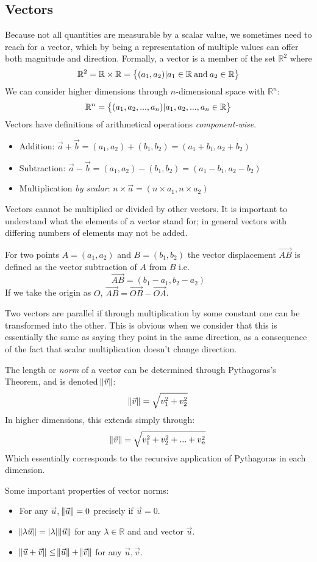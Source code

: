 \documentclass[12pt]{report}
\newcommand{\R}{\mathbb{R}}
\begin{document}
\begin{flushleft}
\section*{Vectors}
Because not all quantities are measurable by a scalar value, we sometimes need to reach
for a vector, which by being a representation of multiple values can offer both magnitude
and direction. Formally, a vector is a member of the set \(\R^2\) where
\[\R^2 = \R \times \R = \set{(a_1, a_2) | a_1 \in \R \:\mathrm{and}\: a_2 \in \R}\]
We can consider higher dimensions through \(n\)-dimensional space with \(\R^n\):
\[\R^n = \set{(a_1, a_2, ..., a_n) | a_1, a_2, ..., a_n \in \R}\]
Vectors have definitions of arithmetical operations \textit{component-wise}.
\begin{itemize}
    \item Addition: \(\vec{a} + \vec{b} = (a_1, a_2) + (b_1, b_2) = (a_1 + b_1, a_2 + b_2)\)
    \item Subtraction: \(\vec{a} - \vec{b} = (a_1, a_2) - (b_1, b_2) = (a_1 - b_1, a_2 - b_2)\)
    \item Multiplication \textit{by scalar}: \(n \times \vec{a} = (n \times a_1, n \times a_2)\)
\end{itemize}
Vectors cannot be multiplied or divided by other vectors. It is important to understand
what the elements of a vector stand for; in general vectors with differing numbers of
elements may not be added.

\bigskip
For two points \(A = (a_1, a_2)\) and \(B = (b_1, b_2)\) the vector displacement \(\vec{AB}\) is
defined as the vector subtraction of \(A\) from \(B\) i.e.
\[\vec{AB} = (b_1 - a_1, b_2 - a_2)\]
If we take the origin as \(O\), \(\vec{AB} = \vec{OB} - \vec{OA}\).

\bigskip
Two vectors are parallel if through multiplication by some constant one can
be transformed into the other. This is obvious when we consider that this is essentially
the same as saying they point in the same direction, as a consequence of the
fact that scalar multiplication doesn't change direction.

\bigskip
The length or \textit{norm} of a vector can be determined through Pythagoras's Theorem, and is
denoted \(\norm{\vec{v}}\):
\[\norm{\vec{v}} = \sqrt{v_1^2 + v_2^2}\]
In higher dimensions, this extends simply through:
\[\norm{\vec{v}} = \sqrt{v_1^2 + v_2^2 + ... + v_n^2}\]
Which essentially corresponds to the recursive application of Pythagoras in each
dimension.

\bigskip
Some important properties of vector norms:
\begin{itemize}
    \item For any \(\vec{u}\), \(\norm{\vec{u}} = 0\) precisely if 
    \(\vec{u} = 0\).
    \item \(\norm{\lambda\vec{u}} = |\lambda|\norm{\vec{u}}\) for any 
    \(\lambda\in\R\) and and vector \(\vec{u}\).
    \item \(\norm{\vec{u} + \vec{v}} \leq \norm{\vec{u}} + \norm{\vec{v}}\) 
    for any \(\vec{u}, \vec{v}\).
\end{itemize}


\end{flushleft}
\end{document}
